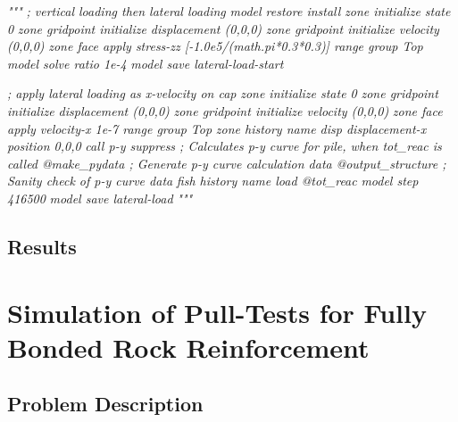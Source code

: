 \documentclass[a4paper, nobind]{templates/ociamthesis}
\newenvironment{Shaded}{\begin{snugshade}}{\end{snugshade}}
\newcommand{\CommentTok}[1]{\textcolor[rgb]{0.56,0.35,0.01}{\textit{#1}}}
\renewenvironment{Shaded}
{
  \vspace{10pt}%
  \begin{snugshade}%
}{%
  \end{snugshade}%
  \vspace{8pt}%
}
\begin{document}
\begin{Shaded}
\begin{Highlighting}[]
\CommentTok{"""}
\CommentTok{; vertical loading then lateral loading}
\CommentTok{model restore \textquotesingle{}install\textquotesingle{}}
\CommentTok{zone initialize state 0}
\CommentTok{zone gridpoint initialize displacement (0,0,0)}
\CommentTok{zone gridpoint initialize velocity     (0,0,0) }
\CommentTok{zone face apply stress{-}zz [{-}1.0e5/(math.pi*0.3*0.3)] range group \textquotesingle{}Top\textquotesingle{}}
\CommentTok{model solve ratio 1e{-}4}
\CommentTok{model save \textquotesingle{}lateral{-}load{-}start\textquotesingle{}}

\CommentTok{; apply lateral loading as x{-}velocity on cap}
\CommentTok{zone initialize state 0}
\CommentTok{zone gridpoint initialize displacement (0,0,0)}
\CommentTok{zone gridpoint initialize velocity     (0,0,0) }
\CommentTok{zone face apply velocity{-}x 1e{-}7 range group \textquotesingle{}Top\textquotesingle{}}
\CommentTok{zone history name \textquotesingle{}disp\textquotesingle{} displacement{-}x position 0,0,0}
\CommentTok{call \textquotesingle{}p{-}y\textquotesingle{} suppress ; Calculates p{-}y curve for pile, when tot\_reac is called}
\CommentTok{@make\_pydata        ; Generate p{-}y curve calculation data }
\CommentTok{@output\_structure   ; Sanity check of p{-}y curve data }
\CommentTok{fish history name \textquotesingle{}load\textquotesingle{} @tot\_reac}
\CommentTok{model step 416500}
\CommentTok{model save \textquotesingle{}lateral{-}load\textquotesingle{}}
\CommentTok{"""}
\end{Highlighting}
\end{Shaded}

\hypertarget{results}{%
\section{Results}\label{results}}

\newpage

\hypertarget{simulation-of-pull-tests-for-fully-bonded-rock-reinforcement}{%
\chapter{Simulation of Pull-Tests for Fully Bonded Rock Reinforcement}\label{simulation-of-pull-tests-for-fully-bonded-rock-reinforcement}}

\hypertarget{problem-description-1}{%
\section{Problem Description}\label{problem-description-1}}
\end{document}
